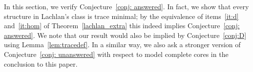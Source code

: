 \documentclass{amsart}
\theoremstyle{definition}
\theoremstyle{remark}
\numberwithin{equation}{section}
\newcommand\green[1]{\textcolor{green!50!black}{#1}}
\begin{document}
In this section, we verify Conjecture~\ref{conj: answered}. In fact, we show that every structure in Lachlan's class is trace minimal; by the equivalence of items~\ref{it:d} and~\ref{it:hom} of Theorem~\ref{lachlan_extra} this indeed implies Conjecture~\ref{conj: answered}. We note that our result would also be implied by Conjecture~\ref{conj:D} using Lemma~\ref{lem:tracedef}. In a similar way, we also ask a stronger version of Conjecture~\ref{conj: unanswered} with respect to model complete cores in the conclusion to this paper.
	




    

 
\end{document}
